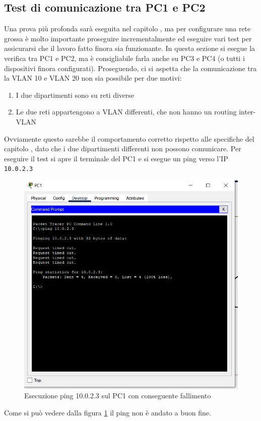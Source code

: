 \documentclass[a4paper,12pt]{report}
\begin{document}
\subsection{Test di comunicazione tra PC1 e PC2}
Una prova più profonda sarà eseguita nel capitolo , ma per configurare una rete grossa è molto importante proseguire incrementalmente ed eseguire vari test per assicurarsi che il lavoro fatto finora sia funzionante.
In questa sezione si esegue la verifica tra PC1 e PC2, ma è consigliabile farla anche su PC3 e PC4 (o tutti i dispositivi finora configurati).
Proseguendo, ci si aspetta che la comunicazione tra la VLAN 10 e VLAN 20 non sia possibile per due motivi:
\begin{enumerate}
    \item I due dipartimenti sono su reti diverse
    \item Le due reti appartengono a VLAN differenti, che non hanno un routing inter-VLAN
\end{enumerate}
Ovviamente questo sarebbe il comportamento corretto rispetto alle specifiche del capitolo , dato che i due dipartimenti differenti non possono comunicare.
%
Per eseguire il test si apre il terminale del PC1 e si esegue un ping verso l'IP \texttt{10.0.2.3}
\begin{figure}[H]
\includegraphics{pc1_test_vlan_differenti.png}
\caption{Esecuzione ping 10.0.2.3 sul PC1 con conseguente fallimento}
\label{fig:pc1_test_vlan_differenti}
\end{figure}
Come si può vedere dalla figura \ref{fig:pc1_test_vlan_differenti} il ping non è andato a buon fine.
\end{document}
